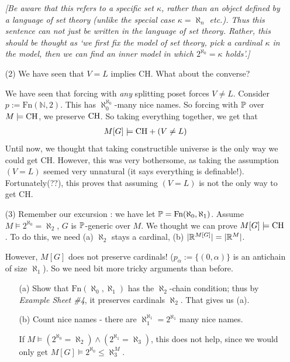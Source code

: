 \documentclass[12pt,a4paper]{article}
\begin{document}
\begin{itemize}
\emph{[Be aware that this refers to a specific set $\kappa$, rather than an object defined by a language of set theory (unlike the special case $\kappa = \aleph_n$ etc.). Thus this sentence can not just be written in the language of set theory. Rather, this should be thought as `we first fix the model of set theory, pick a cardinal $\kappa$ in the model, then we can find an inner model in which $2^{\aleph_0} = \kappa$ holds'.]}

\item[(2)] We have seen that $V=L$ implies CH. What about the converse?
\s

We have seen that forcing with \emph{any} splitting poset forces $V\neq L$. Consider $p:=\text{Fn}(\mathbb{N}, 2)$. This has $\aleph_0^{\aleph_0}$-many nice names. So forcing with $\mathbb{P}$ over $M\models \text{CH}$, we preserve $\text{CH}$. So taking everything together, we get that
\begin{align*}
M[G] \models \text{CH} + (V\neq L)
\end{align*}
Until now, we thought that taking constructible universe is the only way we could get CH. However, this was very bothersome, as taking the assumption $(V =L)$ seemed very unnatural (it says everything is definable!). Fortunately(??), this proves that assuming $(V=L)$ is not the only way to get CH.

\item[(3)] Remember our excursion : we have let $\mathbb{P} = \text{Fn}(\aleph_0, \aleph_1)$. Assume $M \models 2^{\aleph_0} = \aleph_2$, $G$ is $\mathbb{P}$-generic over $M$. We thought we can prove $M[G]\models \text{CH}$. To do this, we need (a) $\aleph_2$ stays a cardinal, (b) $|\mathbb{R}^{M[G]}| = |\mathbb{R}^M|$.

\quad However, $M[G]$ does not preserve cardinals! ($p_{\alpha} := \{(0, \alpha)\}$ is an antichain of size $\aleph_1$). So we need bit more tricky arguments than before.

\begin{itemize}
\item[(a)] Show that $\text{Fn}(\aleph_0, \aleph_1)$ has the $\aleph_2$-chain condition; thus by \emph{Example Sheet \#4}, it preserves cardinals $\aleph_2$. That gives us (a).
\item[(b)] Count nice names - there are $\aleph_1^{\aleph_1}= 2^{\aleph_1}$ many nice names. 

\quad If $M\models (2^{\aleph_0} = \aleph_2) \wedge (2^{\aleph_1} = \aleph_3)$, this does not help, since we would only get $M[G] \models 2^{\aleph_0} \leq \aleph_3^M$.


\end{itemize}
\end{itemize}
\end{document}
